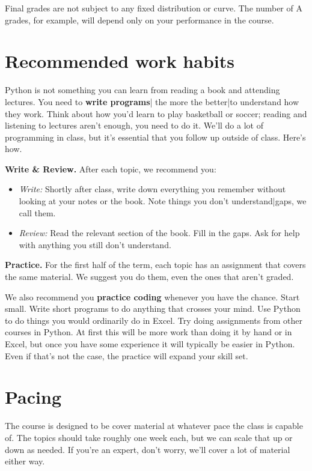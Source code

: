 Final grades are not subject to any fixed distribution or curve. The number of A grades, for example, will depend only on your performance in the course.


\section*{Recommended work habits}

Python is not something you can learn from reading a book and attending lectures.
You need to {\bf write programs\/}|
the more the better|to understand how they work.
Think about how you'd learn to play basketball or soccer;
reading and listening to lectures aren't enough, you need to do it.
We'll do a lot of programming in class, but it's {essential\/} that you
follow up outside of class.
Here's how.

{\bf Write \& Review.\/}
After each topic, we recommend you:
\begin{itemize}
\item {\it Write:\/}  Shortly after class, write down everything you remember
without looking at your notes or the book. Note things you don't understand|gaps, we call them.

\item {\it Review:\/} Read the relevant section of the book.  Fill in the gaps. Ask for help with anything you still don't understand.
\end{itemize}

{\bf Practice.\/}
For the first half of the term, each topic has an assignment that covers the same material.
We suggest you do them, even the ones that aren't graded.

We also recommend you {\bf practice coding\/} whenever you have the chance.
Start small. Write short programs to do anything that crosses your mind.
Use Python to do things you would ordinarily do in Excel.
Try doing assignments from other courses in Python.
At first this will be more work than doing it by hand or in Excel,
but once you have some experience it will typically be easier in Python.
Even if that's not the case, the practice will expand your skill set.


\section*{Pacing}

The course is designed to be cover material at whatever pace the class is capable of.
The topics should take roughly one week each, but we can scale that up or down as needed.
If you're an expert, don't worry, we'll cover a lot of material either way.

